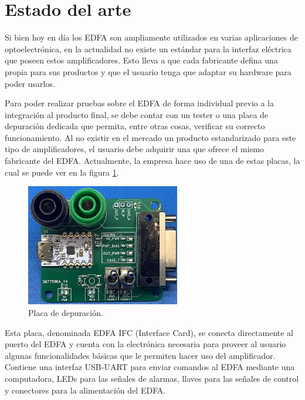 
\section{Estado del arte}

Si bien hoy en día los EDFA son ampliamente utilizados en varias aplicaciones de optoelectrónica, en la actualidad no existe un estándar para la interfaz eléctrica que poseen estos amplificadores. Esto lleva a que cada fabricante defina una propia para sus productos y que el usuario tenga que adaptar su hardware para poder usarlos.

Para poder realizar pruebas sobre el EDFA de forma individual previo a la integración al producto final, se debe contar con un tester o una placa de depuración dedicada que permita, entre otras cosas, verificar su correcto funcionamiento. Al no existir en el mercado un producto estandarizado para este tipo de amplificadores, el usuario debe adquirir una que ofrece el mismo fabricante del EDFA. Actualmente, la empresa hace uso de una de estas placas, la cual se puede ver en la figura \ref{fig:placaDebug}.

\begin{figure}[H]
\centering
\includegraphics[width=0.60\textwidth]{./Figures/placaDebug.jpg}
\caption{Placa de depuración.}
\label{fig:placaDebug}
\end{figure}

Esta placa, denominada EDFA IFC (Interface Card), se conecta directamente al puerto del EDFA y cuenta con la electrónica necesaria para proveer al usuario algunas funcionalidades básicas que le permiten hacer uso del amplificador. Contiene una interfaz USB-UART para enviar comandos al EDFA mediante una computadora, LEDs para las señales de alarmas, llaves para las señales de control y conectores para la alimentación del EDFA.

